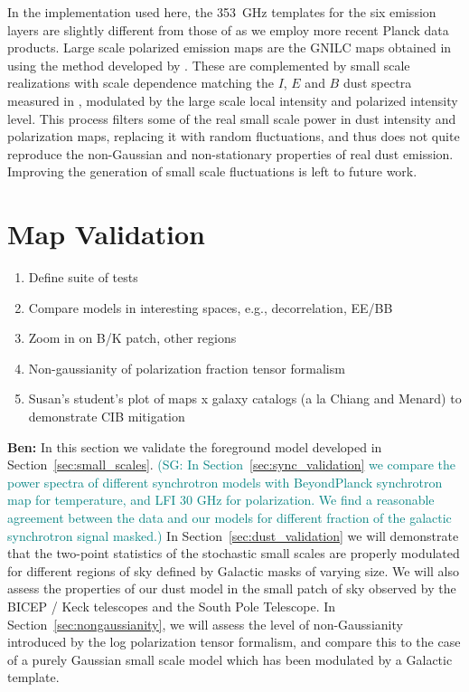 \documentclass[twocolumn]{aastex631}
\newcommand{\sg}[1]{\textcolor{teal}{(SG: #1)}}
\begin{document}
In the implementation used here, the 353~GHz templates for the six emission layers are slightly different from those of \cite{Martinez-Solaeche:2018} as we employ more recent Planck data products. Large scale polarized emission maps are the GNILC maps obtained in \cite{planck2016-l04} using the method developed by \cite{2011MNRAS.418..467R}. These are complemented by small scale realizations with scale dependence matching the $I$, $E$ and $B$ dust spectra measured in \cite{planck2016-l11A}, modulated by the large scale local intensity and polarized intensity level. This process filters some of the real small scale power in dust intensity and polarization maps, replacing it with random fluctuations, and thus does not quite reproduce the non-Gaussian and non-stationary properties of real dust emission. Improving the generation of small scale fluctuations is left to future work.


\section{Map Validation} \label{sec:validation}
\begin{enumerate}
    \item Define suite of tests
    \item Compare models in interesting spaces, e.g., decorrelation, EE/BB
    \item Zoom in on B/K patch, other regions
    \item Non-gaussianity of polarization fraction tensor formalism
    \item Susan's student's plot of maps x galaxy catalogs (a la Chiang and Menard) to demonstrate CIB mitigation
\end{enumerate}

\textbf{Ben:} In this section we validate the foreground model developed in Section~\ref{sec:small_scales}. \sg{In Section~\ref{sec:sync_validation} we compare the power spectra of different synchrotron models with BeyondPlanck synchrotron map for temperature, and LFI 30 GHz for polarization. We find a reasonable agreement between the data and our models for different fraction of the galactic synchrotron signal masked.} In Section~\ref{sec:dust_validation} we will demonstrate that the two-point statistics of the stochastic small scales are properly modulated for different regions of sky defined by Galactic masks of varying size. We will also assess the properties of our dust model in the small patch of sky observed by the BICEP / Keck telescopes and the South Pole Telescope. In Section~\ref{sec:nongaussianity}, we will assess the level of non-Gaussianity introduced by the log polarization tensor formalism, and compare this to the case of a purely Gaussian small scale model which has been modulated by a Galactic template. 
\end{document}

